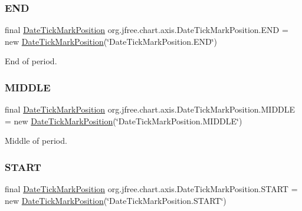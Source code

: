 \subsubsection{\texorpdfstring{E\+ND}{END}}
{\footnotesize\ttfamily final \mbox{\hyperlink{classorg_1_1jfree_1_1chart_1_1axis_1_1_date_tick_mark_position}{Date\+Tick\+Mark\+Position}} org.\+jfree.\+chart.\+axis.\+Date\+Tick\+Mark\+Position.\+E\+ND = new \mbox{\hyperlink{classorg_1_1jfree_1_1chart_1_1axis_1_1_date_tick_mark_position}{Date\+Tick\+Mark\+Position}}(\char`\"{}Date\+Tick\+Mark\+Position.\+E\+ND\char`\"{})\hspace{0.3cm}{\ttfamily [static]}}

End of period. \mbox{\label{classorg_1_1jfree_1_1chart_1_1axis_1_1_date_tick_mark_position_a48598de9d55d245a060fbddaaebf0738}} 
\subsubsection{\texorpdfstring{M\+I\+D\+D\+LE}{MIDDLE}}
{\footnotesize\ttfamily final \mbox{\hyperlink{classorg_1_1jfree_1_1chart_1_1axis_1_1_date_tick_mark_position}{Date\+Tick\+Mark\+Position}} org.\+jfree.\+chart.\+axis.\+Date\+Tick\+Mark\+Position.\+M\+I\+D\+D\+LE = new \mbox{\hyperlink{classorg_1_1jfree_1_1chart_1_1axis_1_1_date_tick_mark_position}{Date\+Tick\+Mark\+Position}}(\char`\"{}Date\+Tick\+Mark\+Position.\+M\+I\+D\+D\+LE\char`\"{})\hspace{0.3cm}{\ttfamily [static]}}

Middle of period. \mbox{\label{classorg_1_1jfree_1_1chart_1_1axis_1_1_date_tick_mark_position_a92d2b57239eec45356930a03a0107dbc}} 
\subsubsection{\texorpdfstring{S\+T\+A\+RT}{START}}
{\footnotesize\ttfamily final \mbox{\hyperlink{classorg_1_1jfree_1_1chart_1_1axis_1_1_date_tick_mark_position}{Date\+Tick\+Mark\+Position}} org.\+jfree.\+chart.\+axis.\+Date\+Tick\+Mark\+Position.\+S\+T\+A\+RT = new \mbox{\hyperlink{classorg_1_1jfree_1_1chart_1_1axis_1_1_date_tick_mark_position}{Date\+Tick\+Mark\+Position}}(\char`\"{}Date\+Tick\+Mark\+Position.\+S\+T\+A\+RT\char`\"{})\hspace{0.3cm}{\ttfamily [static]}}

